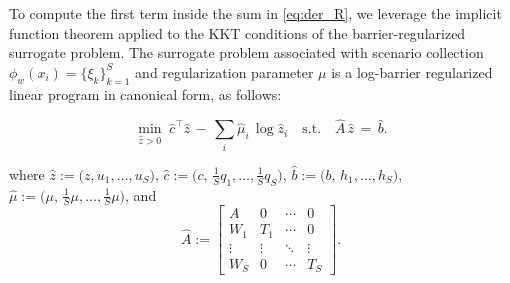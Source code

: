 \documentclass{article}
\begin{document}
To compute  the first term inside the sum in \eqref{eq:der_R},  we  leverage
the implicit function theorem applied to the KKT conditions of the
barrier-regularized surrogate problem.
The surrogate problem associated with scenario collection $\phi_w(x_i)=\{\xi_k\}_{k=1}^S$
and regularization parameter $\mu$ is a log-barrier regularized linear
program in canonical form, as follows:

\begin{equation}
    \label{eq:logbar_CanLP}
    \min_{\hat z > 0} \; \hat c^\top \hat z \, - \, \sum_{i} \hat \mu_i \, \log \hat z_i \quad \text{s.t.} \quad \hat A \, \hat z \,=\, \hat b.
\end{equation}

where $\hat{z}:=\big(z,u_1,\ldots,u_S\big)$, $\hat c  := \big(c, \, \tfrac{1}{S}q_1,\dots,\tfrac{1}{S}q_S\big)$, $\hat b  := \big(b, \, h_1,\dots,h_S\big)$, $\hat \mu := \big(\mu, \, \tfrac{1}{S}\mu,\dots,\tfrac{1}{S}\mu\big)$,
and
\begin{equation}
\label{eq::extensive_form_shape}
    \hat A    :=
    \begin{bmatrix}
        A & 0 & \cdots & 0 \\ W_1 & T_1 & \cdots & 0 \\ \vdots & \vdots & \ddots &
        \vdots             \\ W_S & 0 & \cdots & T_S
    \end{bmatrix}
    .
\end{equation}
\end{document}
